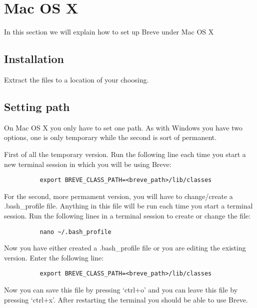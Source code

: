 \section{Mac OS X}
	In this section we will explain how to set up Breve under Mac OS X

\subsection{Installation}
	Extract the files to a location of your choosing.

\subsection{Setting path}
	On Mac OS X you only have to set one path. As with Windows you have two options, one is only temporary while the second is sort of permanent. 

	First of all the temporary version. Run the following line each time you start a new terminal session in which you will be using Breve:
	\begin{verbatim}
		  export BREVE_CLASS_PATH=<breve_path>/lib/classes
	\end{verbatim}

	For the second, more permament version, you will have to change/create a .bash\_profile file. Anything in this file will be run each time you start a terminal session. Run the following lines in a terminal session to create or change the file:
	\begin{verbatim}
		  nano ~/.bash_profile
	\end{verbatim}
	Now you have either created a .bash\_profile file or you are editing the existing version. Enter the following line:
	\begin{verbatim}
		  export BREVE_CLASS_PATH=<breve_path>/lib/classes
	\end{verbatim}
	Now you can save this file by pressing `ctrl+o' and you can leave this file by pressing `ctrl+x'. After restarting the terminal you should be able to use Breve. 

